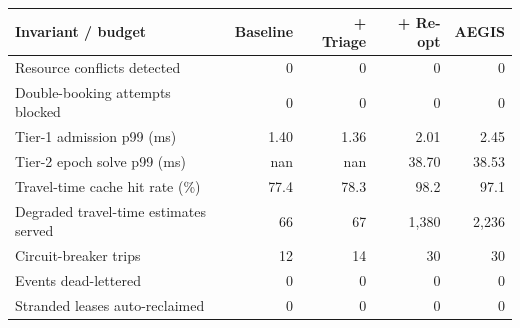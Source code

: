 \begin{tabular}{@{}lrrrr@{}}
\toprule
Invariant / budget & Baseline & + Triage & + Re-opt & AEGIS \\
\midrule
Resource conflicts detected & 0 & 0 & 0 & 0 \\
Double-booking attempts blocked & 0 & 0 & 0 & 0 \\
Tier-1 admission p99 (ms) & 1.40 & 1.36 & 2.01 & 2.45 \\
Tier-2 epoch solve p99 (ms) & nan & nan & 38.70 & 38.53 \\
Travel-time cache hit rate (\%) & 77.4 & 78.3 & 98.2 & 97.1 \\
Degraded travel-time estimates served & 66 & 67 & 1,380 & 2,236 \\
Circuit-breaker trips & 12 & 14 & 30 & 30 \\
Events dead-lettered & 0 & 0 & 0 & 0 \\
Stranded leases auto-reclaimed & 0 & 0 & 0 & 0 \\
\bottomrule
\end{tabular}